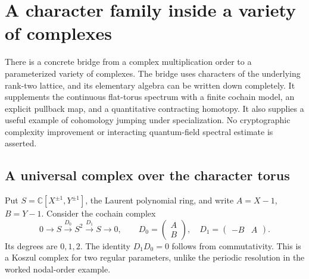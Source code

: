 \chapter{A character family inside a variety of complexes}
\label{ch:character-bridge}

There is a concrete bridge from a complex multiplication order to a
parameterized variety of complexes.  The bridge uses characters of the
underlying rank-two lattice, and its elementary algebra can be written down
completely.  It supplements the continuous flat-torus spectrum with a finite
cochain model, an explicit pullback map, and a quantitative contracting
homotopy.  It also supplies a useful example of cohomology jumping under
specialization.  No cryptographic complexity improvement or interacting
quantum-field spectral estimate is asserted.

\section{A universal complex over the character torus}

Put $S=\mathbb C[X^{\pm1},Y^{\pm1}]$, the Laurent polynomial ring, and
write $A=X-1$, $B=Y-1$.  Consider the cochain complex
\begin{equation}
 0\longrightarrow S\xrightarrow{D_0}S^2
 \xrightarrow{D_1}S\longrightarrow0,
 \qquad
 D_0=\begin{pmatrix}A\\B\end{pmatrix},\quad
 D_1=\begin{pmatrix}-B&A\end{pmatrix}.
 \label{eq:character-universal}
\end{equation}
Its degrees are $0,1,2$.  The identity $D_1D_0=0$ follows from
commutativity.  This is a Koszul complex for two regular parameters, unlike
the periodic resolution in the worked nodal-order example.


